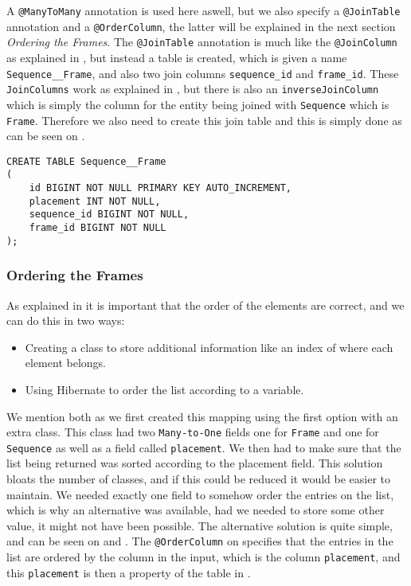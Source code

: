 A \texttt{@ManyToMany} annotation is used here aswell, but we also specify a \texttt{@JoinTable} annotation and a \texttt{@OrderColumn}, the latter will be explained in the next section \textit{Ordering the Frames}.
The \texttt{@JoinTable} annotation is much like the \texttt{@JoinColumn} as explained in , but instead a table is created, which is given a name \texttt{Sequence\_\_Frame}, and also two join columns \texttt{sequence\_id} and \texttt{frame\_id}.
These \texttt{JoinColumns} work as explained in , but there is also an \texttt{inverseJoinColumn} which is simply the column for the entity being joined with \texttt{Sequence} which is \texttt{Frame}.
Therefore we also need to create this join table and this is simply done as can be seen on .

\begin{lstlisting}[float, floatplacement=h, caption={The table creation of the join table between \texttt{Sequence} and \texttt{Frame}.},label={lst:sql-frame-sequence}]
CREATE TABLE Sequence__Frame
(
    id BIGINT NOT NULL PRIMARY KEY AUTO_INCREMENT,
    placement INT NOT NULL,
    sequence_id BIGINT NOT NULL,
    frame_id BIGINT NOT NULL
);
\end{lstlisting}


\subsubsection{Ordering the Frames}

As explained in  it is important that the order of the elements are correct, and we can do this in two ways:

\begin{itemize}
	\item Creating a class to store additional information like an index of where each element belongs.
	\item Using Hibernate to order the list according to a variable.
\end{itemize}

We mention both as we first created this mapping using the first option with an extra class.
This class had two \texttt{Many-to-One} fields one for \texttt{Frame} and one for \texttt{Sequence} as well as a field called \texttt{placement}.
We then had to make sure that the list being returned was sorted according to the placement field.
This solution bloats the number of classes, and if this could be reduced it would be easier to maintain.
We needed exactly one field to somehow order the entries on the list, which is why an alternative was available, had we needed to store some other value, it might not have been possible.
The alternative solution is quite simple, and can be seen on  and .
The \texttt{@OrderColumn} on  specifies that the entries in the list are ordered by the column in the input, which is the column \texttt{placement}, and this \texttt{placement} is then a property of the table in .
